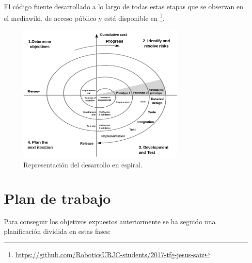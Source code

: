 \hspace{1cm} El código fuente desarrollado a lo largo de todas estas etapas que se observan en el mediawiki, de acceso público y está disponible en  \footnote{\url{https://github.com/RoboticsURJC-students/2017-tfg-jesus-saiz}}.
\\

\begin{figure}[H]
	\begin{center}
		\includegraphics[width=0.75\textwidth]{imag/IMG17.png}
				\caption{Representación del desarrollo en espiral.} 
	\label{fig:Desarrollo en espiral.}	
	\end{center}
\end{figure}


\section{Plan de trabajo}
\hspace{1cm} Para conseguir los objetivos expuestos anteriormente se ha seguido una planificación dividida en estas fases:

